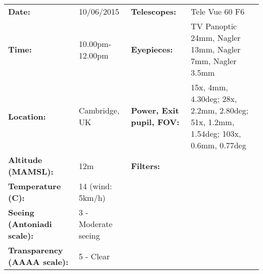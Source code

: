 \begin{tabular}{ p{1.7in} p{1.2in} p{1.5in} p{4.2in}}
{\bf Date:} & 10/06/2015 & {\bf Telescopes:} & Tele Vue 60 F6 \\ 
{\bf Time:} & 10.00pm-12.00pm & {\bf Eyepieces:} & TV Panoptic 24mm, Nagler 13mm, Nagler 7mm, Nagler 3.5mm \\ 
{\bf Location:} & Cambridge, UK & {\bf Power, Exit pupil, FOV:} & 15x, 4mm, 4.30deg; 28x, 2.2mm, 2.80deg; 51x, 1.2mm, 1.54deg; 103x, 0.6mm, 0.77deg \\ 
{\bf Altitude (MAMSL):} & 12m & {\bf Filters:} &  \\ 
{\bf Temperature (C):} & 14 (wind: 5km/h) & & \\ 
{\bf Seeing (Antoniadi scale):} & 3 - Moderate seeing & & \\ 
{\bf Transparency (AAAA scale):} & 5 - Clear & & \\ 
\end{tabular}
\centering 
